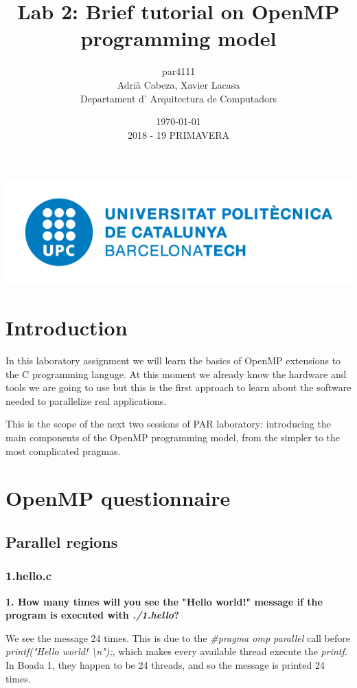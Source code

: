 \documentclass[12]{article}
\author{par4111 \\ Adrià Cabeza, Xavier Lacasa \\ Departament d' Arquitectura de Computadors}
\title{Lab 2: Brief tutorial on OpenMP programming model }
\date{\today \\ 2018 - 19 PRIMAVERA}
\begin{document}
\maketitle

\vspace*{\fill}
\begin{center}
\includegraphics[scale=0.5]{images/UPClogo.png}
\end{center}
\newpage
\tableofcontents
\newpage
\section{Introduction}

In this laboratory assignment we will learn the basics of OpenMP extensions to the C programming languge. At this moment we already know the hardware and tools we are going to use but this is the first approach to learn about the software needed to parallelize real applications. 

This is the scope of the next two sessions of PAR laboratory: introducing the  main components of the OpenMP programming model, from the simpler to the most complicated pragmas. 

\section{OpenMP questionnaire}

\subsection{Parallel regions}
\subsubsection{1.hello.c}
\textbf{1. How many times will you see the "Hello world!" message if the program is executed with \textit{./1.hello}?}

We see the message 24 times. This is due to the \textit{\#pragma omp parallel} call before \textit{printf("Hello world! \textbackslash n");}, which makes every available thread execute the \textit{printf}. In Boada 1, they happen to be 24 threads, and so the message is printed 24 times.
\end{document}
